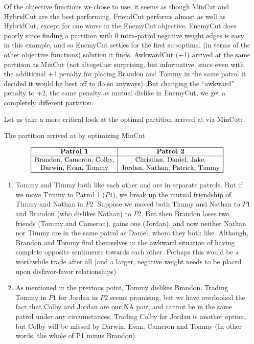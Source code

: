 \documentclass{amsart}
\theoremstyle{definition}
\theoremstyle{remark}
\numberwithin{equation}{section}
\begin{document}
Of the objective functions we chose to use, it seems as though MinCut and HybridCut are the best performing. FriendCut performs almost as well as HybridCut, except for one worse in the EnemyCut objective. EnemyCut does poorly since finding a partition with 0 intra-patrol negative weight edges is easy in this example, and so EnemyCut settles for the first suboptimal (in terms of the other objective functions) solution it finds. AwkwardCut (+1) arrived at the same partition as MinCut (not altogether surprising, but informative, since even with the additional +1 penalty for placing Brandon and Tommy in the same patrol it decided it would be best off to do so anyways). But changing the ``awkward'' penalty to +2, the same penalty as mutual dislike in EnemyCut, we get a completely different partition.

Let us take a more critical look at the optimal partition arrived at via MinCut:

\begin{table}[h]
	\caption{The partition arrived at by optimizing MinCut}\label{eqtable}
	\renewcommand\arraystretch{1.5}
	\noindent\[
	\begin{array}{|c|c|}
	\hline
	\textbf{Patrol 1}&\textbf{Patrol 2}\\
	\hline
	\text{Brandon, Cameron, Colby,}&\text{Christian, Daniel, Jake,}\\
	\text{Darwin, Evan, Tommy}&\text{Jordan, Nathan, Patrick, Timmy}\\
	\hline
	\end{array}
	\]
\end{table}

\begin{enumerate}
	\item Tommy and Timmy both like each other and are in separate patrols. But if we move Timmy to Patrol 1 ($P1$), we break up the mutual friendship of Timmy and Nathan in $P2$. Suppose we moved both Timmy and Nathan to $P1$ and Brandon (who dislikes Nathan) to $P2$. But then Brandon loses two friends (Tommy and Cameron), gains one (Jordan), and now neither Nathan nor Timmy are in the same patrol as Daniel, whom they both like. Although, Brandon and Tommy find themselves in the awkward situation of having complete opposite sentiments towards each other. Perhaps this would be a worthwhile trade after all (and a larger, negative weight needs to be placed upon disfavor-favor relationships).
	
	\item As mentioned in the previous point, Tommy dislikes Brandon. Trading Tommy in $P1$ for Jordan in $P2$ seems promising, but we have overlooked the fact that Colby and Jordan are our NA pair, and cannot be in the same patrol under any circumstances. Trading Colby for Jordan is another option, but Colby will be missed by Darwin, Evan, Cameron and Tommy (In other words, the whole of P1 minus Brandon).
\end{enumerate}
\end{document}
